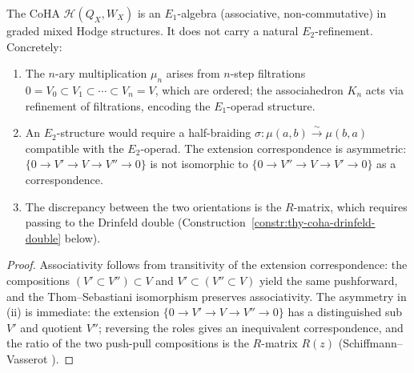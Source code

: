 \begin{proposition}
\label{prop:thy-coha-e1-not-e2}
The CoHA $\mathcal{H}(Q_X, W_X)$ is an $E_1$-algebra (associative,
non-commutative) in graded mixed Hodge structures. It does not
carry a natural $E_2$-refinement. Concretely:
\begin{enumerate}[label=\emph{(\roman*)}]
 \item The $n$-ary multiplication $\mu_n$ arises from $n$-step
 filtrations $0 = V_0 \subset V_1 \subset \cdots \subset V_n = V$,
 which are ordered; the associahedron $K_n$ acts via refinement of
 filtrations, encoding the $E_1$-operad structure.
 \item An $E_2$-structure would require a half-braiding
 $\sigma \colon \mu(a,b) \xrightarrow{\sim} \mu(b,a)$ compatible
 with the $E_2$-operad. The extension correspondence is asymmetric:
 $\{0\to V'\to V\to V''\to 0\}$ is not isomorphic to
 $\{0\to V''\to V\to V'\to 0\}$ as a correspondence.
 \item The discrepancy between the two orientations is the
 $R$-matrix, which requires passing to the Drinfeld double
 (Construction~\ref{constr:thy-coha-drinfeld-double} below).
\end{enumerate}
\end{proposition}

\begin{proof}
Associativity follows from transitivity of the extension
correspondence: the compositions $(V'\subset V'')\subset V$ and
$V'\subset(V''\subset V)$ yield the same pushforward, and the
Thom--Sebastiani isomorphism preserves associativity. The
asymmetry in (ii) is immediate: the extension
$\{0\to V'\to V\to V''\to 0\}$ has a distinguished sub $V'$ and
quotient $V''$; reversing the roles gives an inequivalent
correspondence, and the ratio of the two push-pull compositions
is the $R$-matrix $R(z)$ (Schiffmann--Vasserot
\cite{SV-elliptic-hall}).
\end{proof}


